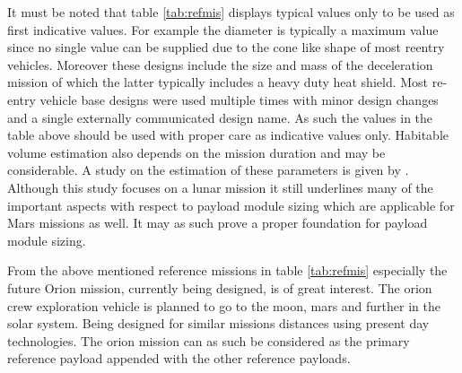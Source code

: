 It must be noted that table \ref{tab:refmis} displays typical values only to be used as first indicative values. For example the diameter is typically a maximum value since no single value can be supplied due to the cone like shape of most reentry vehicles. Moreover these designs include the size and mass of the deceleration mission of which the latter typically includes a heavy duty heat shield. Most re-entry vehicle base designs were used multiple times with minor design changes and a single externally communicated design name. As such the values in the table above should be used with proper care as indicative values only. Habitable volume estimation also depends on the mission duration and may be considerable. A study on the estimation of these parameters is given by \cite{Rudisill2008}. Although this study focuses on a lunar mission it still underlines many of the important aspects with respect to payload module sizing which are applicable for Mars missions as well. It may as such prove a proper foundation for payload module sizing. 

From the above mentioned reference missions in table \ref{tab:refmis} especially the future Orion mission, currently being designed, is of great interest. The orion crew exploration vehicle is planned to go to the moon, mars and further in the solar system. Being designed for similar missions distances using present day technologies. The orion mission can as such be considered as the primary reference payload appended with the other reference payloads.


